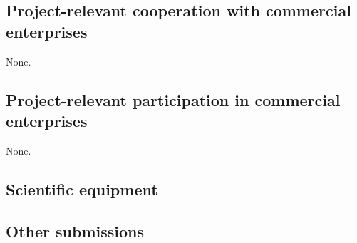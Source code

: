 \subsection{Project-relevant cooperation with commercial enterprises}
None.

\subsection{Project-relevant participation in commercial enterprises}
None.

\subsection{Scientific equipment}

\subsection{Other submissions}


